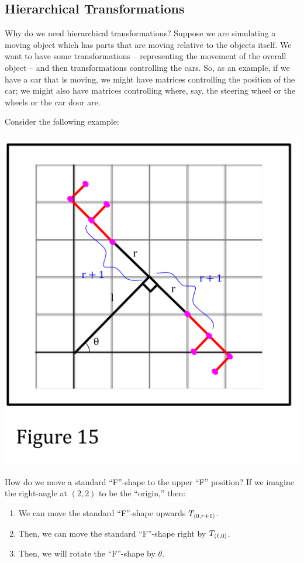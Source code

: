 \documentclass[letterpaper]{article}
\begin{document}
\subsection{Hierarchical Transformations}
Why do we need hierarchical transformations? Suppose we are simulating a moving object which has parts that are moving relative to the objects itself. We want to have some transformations -- representing the movement of the overall object -- and then transformations controlling the cars. So, as an example, if we have a car that is moving, we might have matrices controlling the position of the car; we might also have matrices controlling where, say, the steering wheel or the wheels or the car door are. 

\bigskip 

Consider the following example: 
\begin{center}
    \includegraphics[scale=0.5]{../assets/f14.png}
\end{center}
How do we move a standard ``F''-shape to the upper ``F'' position? If we imagine the right-angle at $(2, 2)$ to be the ``origin,'' then: 
\begin{enumerate}
    \item We can move the standard ``F''-shape upwards $T_{\langle 0, r + 1 \rangle}$.
    \item Then, we can move the standard ``F''-shape right by $T_{\langle \ell, 0 \rangle}$.
    \item Then, we will rotate the ``F''-shape by $\theta$. 
\end{enumerate}
\end{document}
